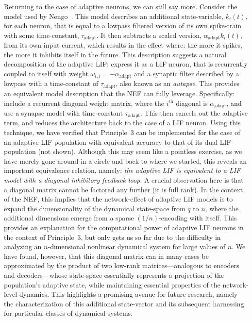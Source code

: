 Returning to the case of adaptive neurons, we can still say more.
Consider the model used by Nengo~\citep{camera2004minimal}.
This model describes an additional state-variable, $k_i(t)$, for each neuron, that is equal to a lowpass filtered version of its own spike-train with some time-constant, $\tau_\text{adapt}$.
It then subtracts a scaled version, $\alpha_\text{adapt} k_i(t)$, from its own input current, which results in the effect where: the more it spikes, the more it inhibits itself in the future.
This description suggests a natural decomposition of the adaptive LIF: express it as a LIF neuron, that is recurrently coupled to itself with weight $\omega_{i,i} = -\alpha_\text{adapt}$ and a synaptic filter described by a lowpass with a time-constant of $\tau_\text{adapt}$, also known as an \emph{autapse}.
This provides an equivalent model description that the NEF can fully leverage.
Specifically: include a recurrent diagonal weight matrix, where the $i^\text{th}$ diagonal is $\alpha_\text{adapt}$, and use a synapse model with time-constant $\tau_\text{adapt}$.
This then cancels out the adaptive term, and reduces the architecture back to the case of a LIF neuron.
Using this technique, we have verified that Principle~3 can be implemented for the case of an adaptive LIF population with equivalent accuracy to that of its dual LIF population (not shown).
Although this may seem like a pointless exercise, as we have merely gone around in a circle and back to where we started, this reveals an important equivalence relation, namely:
\emph{the adaptive LIF is equivalent to a LIF model with a diagonal inhibitory feedback loop}.
A crucial observation here is that a diagonal matrix cannot be factored any further (it is full rank).
In the context of the NEF, this implies that the network-effect of adaptive LIF models is to expand the dimensionality of the dynamical state-space from $q$ to $n$, where the additional dimensions emerge from a sparse $(1/n)$-encoding with itself.
This provides an explanation for the computational power of adaptive LIF neurons in the context of Principle~3, but only gets us so far due to the difficulty in analyzing an $n$-dimensional nonlinear dynamical system for large values of $n$.
We have found, however, that this diagonal matrix can in many cases be approximated by the product of two low-rank matrices---analogous to encoders and decoders---whose state-space essentially represents a projection of the population's adaptive state, while maintaining essential properties of the network-level dynamics.
This highlights a promising avenue for future research, namely the characterization of this additional state-vector and its subsequent harnessing for particular classes of dynamical systems.

